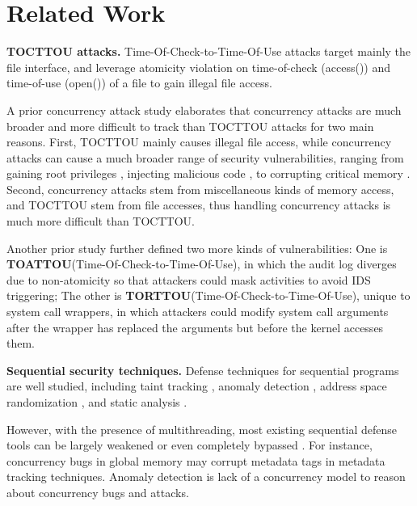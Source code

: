 \section{Related Work} \label{sec:related}


\textbf{TOCTTOU attacks.} Time-Of-Check-to-Time-Of-Use attacks \cite{bishop1996checking,tsyrklevich2003dynamic, tsafrir2008portably,wei2005tocttou}
target mainly the file interface, and
leverage atomicity violation on time-of-check (access())
and time-of-use (open()) of a file to gain illegal file access. 

A prior concurrency attack study \cite{yang2016concurrency} elaborates that concurrency
attacks are much broader and more difficult to track
than TOCTTOU attacks for two main reasons. First, TOCTTOU
mainly causes illegal file access, while concurrency attacks
can cause a much broader range of security vulnerabilities,
ranging from gaining root privileges \cite{uselib-bug-12791} , injecting malicious
code \cite{freebsdcve}, to corrupting critical memory \cite{apache-bug-25520}. Second, concurrency
attacks stem from miscellaneous kinds of memory access, and
TOCTTOU stem from file accesses, thus handling concurrency
attacks is much more difficult than TOCTTOU.

Another prior study \cite{concurrency:woot07} further
defined two more kinds of vulnerabilities: One is \textbf{TOATTOU}(Time-Of-Check-to-Time-Of-Use),
in which the audit log diverges due to non-atomicity so that attackers could mask activities to avoid IDS triggering; 
The other is \textbf{TORTTOU}(Time-Of-Check-to-Time-Of-Use), unique to system call wrappers, in which attackers could 
modify system call arguments after the wrapper has replaced the arguments but before the kernel accesses them.

\noindent
\textbf{Sequential security techniques.} Defense techniques for sequential
programs are well studied, including taint tracking \cite{taintdroid:osdi10,lift:micro06,sospinfomationflowcontrol,valgrind:pldi}, 
anomaly detection \cite{taskrecycling:ppopp90,schonberg:pldi89}, address space
randomization \cite{aslr-fail:ccs04}, and static analysis \cite{seth:pldi,engler:vmcai,wagner:intrusion,coverity:cacm,klee:osdi08}.

However, with the presence of multithreading, most existing
sequential defense tools can be largely weakened or even
completely bypassed \cite{con-tr}. For instance, concurrency bugs
in global memory may corrupt metadata tags in metadata
tracking techniques. Anomaly detection is lack of a concurrency
model to reason about concurrency bugs and attacks.


